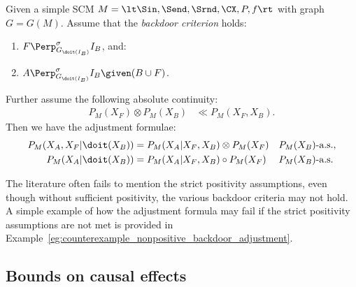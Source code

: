 \begin{Cor}\label{cor:backdoor-scms}
  Given a simple SCM $M = \lt \Sin, \Send, \Srnd, \CX, P, f \rt$ with graph $G = G(M)$. %
  Assume that the \emph{backdoor criterion} holds:
  \begin{enumerate}
    \item $\displaystyle F \Perp^\sigma_{G_{\doit(I_B)}} I_B$, and:
    \item $\displaystyle A \Perp^\sigma_{G_{\doit(I_B)}} I_B  \given (B \cup F)$.
  \end{enumerate}
  Further assume the following absolute continuity:
  \begin{align*}
      P_M(X_F) \otimes P_M(X_B) &\ll  P_M(X_F,X_B).
  \end{align*}
  Then we have the adjustment formulae: 
  \begin{align*} 
    P_M(X_A,X_F|\doit(X_B)) &= P_M(X_A|X_F,X_B) \otimes P_M(X_F)  && P_M(X_B)\text{-a.s.}, \\
    P_M(X_A|\doit(X_B)) &= P_M(X_A|X_F,X_B) \circ P_M(X_F)   && P_M(X_B)\text{-a.s.}
  \end{align*}
\end{Cor}
The literature often fails to mention the strict positivity assumptions, even though without sufficient positivity, the various backdoor criteria may not hold.
A simple example of how the adjustment formula may fail if the strict positivity assumptions are not met is provided in Example~\ref{eg:counterexample_nonpositive_backdoor_adjustment}.


\subsection{Bounds on causal effects}


